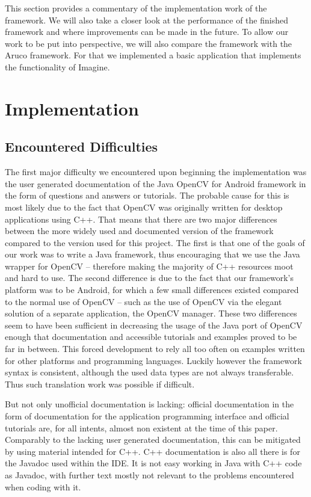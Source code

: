 This section provides a commentary of the implementation work of the framework.
We will also take a closer look at the performance of the finished framework and where improvements can be made in the future.
To allow our work to be put into perspective, we will also compare the framework with the Aruco framework.
For that we implemented a basic application that implements the functionality of Imagine.

\section{Implementation}
\label{implementation}

\subsection{Encountered Difficulties}

The first major difficulty we encountered upon beginning the implementation was the user generated documentation of the Java OpenCV for Android framework in the form of questions and answers or tutorials.
The probable cause for this is most likely due to the fact that OpenCV was originally written for desktop applications using C++.
That means that there are two major differences between the more widely used and documented version of the framework compared to the version used for this project.
The first is that one of the goals of our work was to write a Java framework, thus encouraging that we use the Java wrapper for OpenCV – therefore making the majority of C++ resources moot and hard to use.
The second difference is due to the fact that our framework's platform was to be Android, for which a few small differences existed compared to the normal use of OpenCV – such as the use of OpenCV via the elegant solution of a separate application, the OpenCV manager.
These two differences seem to have been sufficient in decreasing the usage of the Java port of OpenCV enough that documentation and accessible tutorials and examples proved to be far in between.
This forced development to rely all too often on examples written for other platforms and programming languages.
Luckily however the framework syntax is consistent, although the used data types are not always transferable.
Thus such translation work was possible if difficult.

But not only unofficial documentation is lacking: official documentation in the form of documentation for the application programming interface and official tutorials are, for all intents, almost non existent at the time of this paper.
Comparably to the lacking user generated documentation, this can be mitigated by using material intended for C++.
C++ documentation is also all there is for the Javadoc used within the IDE.
It is not easy working in Java with C++ code as Javadoc, with further text mostly not relevant to the problems encountered when coding with it.

